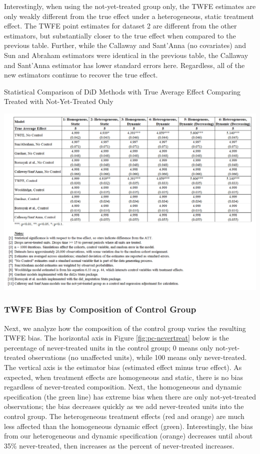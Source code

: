 \documentclass[12pt]{article}
\begin{document}
Interestingly, when using the not-yet-treated group only, the TWFE estimates are only weakly different from the true effect under a heterogeneous, static treatment effect. The TWFE point estimates for dataset 2 are different from the other estimators, but substantially closer to the true effect when compared to the previous table. Further, while the Callaway and Sant’Anna (no covariates) and Sun and Abraham estimators were identical in the previous table, the Callaway and Sant’Anna estimator has lower standard errors here. Regardless, all of the new estimators continue to recover the true effect.
\begin{table}[H]
    \centering
    \caption{Statistical Comparison of DiD Methods with True Average Effect
Comparing Treated with Not-Yet-Treated Only}
    \includegraphics[width=6in]{Figures/Table 2.png}
    \label{tab:estimators-notyet}
\end{table}
\subsubsection{TWFE Bias by Composition of Control Group}
Next, we analyze how the composition of the control group varies the resulting TWFE bias. The horizontal axis in Figure \ref{fig:pc-nevertreat} below is the percentage of never-treated units in the control group; 0 means only not-yet-treated observations (no unaffected units), while 100 means only never-treated. The vertical axis is the  estimator bias (estimated effect minus true effect). As expected, when treatment effects are homogeneous and static, there is no bias regardless of never-treated composition. Next, the homogeneous and dynamic specification (the green line) has extreme bias when there are only not-yet-treated observations; the bias decreases quickly as we add never-treated units into the control group. The heterogeneous treatment effects (red and orange) are much less affected than the homogeneous dynamic effect (green). Interestingly, the bias from our heterogeneous and dynamic specification (orange) decreases until about 35\% never-treated, then increases as the percent of never-treated increases.
\end{document}
